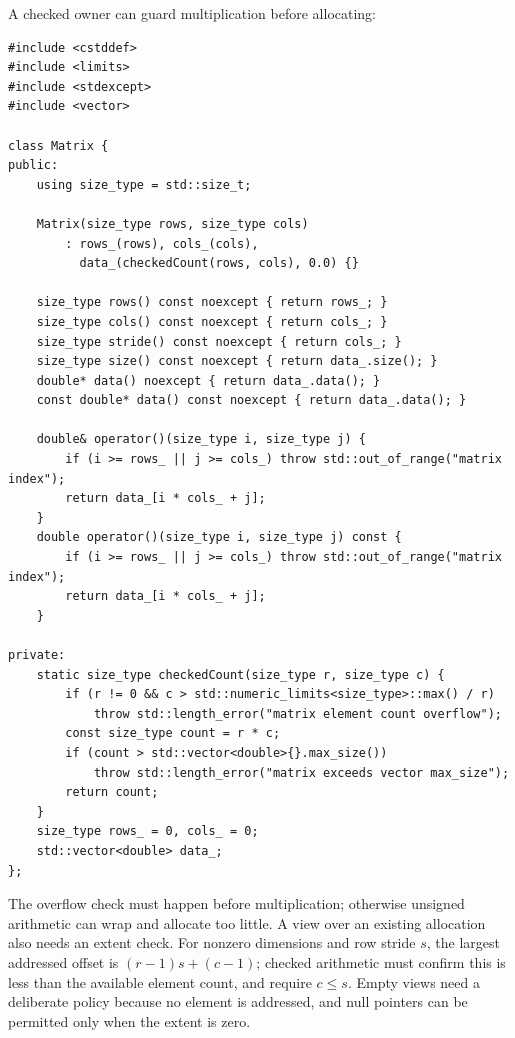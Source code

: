 A checked owner can guard multiplication before allocating:

\begin{verbatim}
#include <cstddef>
#include <limits>
#include <stdexcept>
#include <vector>

class Matrix {
public:
    using size_type = std::size_t;

    Matrix(size_type rows, size_type cols)
        : rows_(rows), cols_(cols),
          data_(checkedCount(rows, cols), 0.0) {}

    size_type rows() const noexcept { return rows_; }
    size_type cols() const noexcept { return cols_; }
    size_type stride() const noexcept { return cols_; }
    size_type size() const noexcept { return data_.size(); }
    double* data() noexcept { return data_.data(); }
    const double* data() const noexcept { return data_.data(); }

    double& operator()(size_type i, size_type j) {
        if (i >= rows_ || j >= cols_) throw std::out_of_range("matrix index");
        return data_[i * cols_ + j];
    }
    double operator()(size_type i, size_type j) const {
        if (i >= rows_ || j >= cols_) throw std::out_of_range("matrix index");
        return data_[i * cols_ + j];
    }

private:
    static size_type checkedCount(size_type r, size_type c) {
        if (r != 0 && c > std::numeric_limits<size_type>::max() / r)
            throw std::length_error("matrix element count overflow");
        const size_type count = r * c;
        if (count > std::vector<double>{}.max_size())
            throw std::length_error("matrix exceeds vector max_size");
        return count;
    }
    size_type rows_ = 0, cols_ = 0;
    std::vector<double> data_;
};
\end{verbatim}

The overflow check must happen before multiplication; otherwise unsigned arithmetic can wrap and allocate too little. A view over an existing allocation also needs an extent check. For nonzero dimensions and row stride \(s\), the largest addressed offset is \((r-1)s+(c-1)\); checked arithmetic must confirm this is less than the available element count, and require \(c\le s\). Empty views need a deliberate policy because no element is addressed, and null pointers can be permitted only when the extent is zero.

